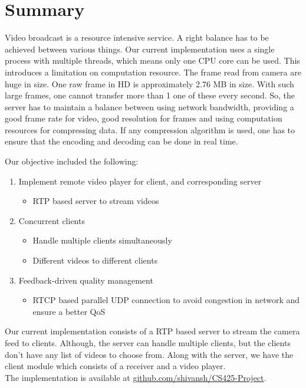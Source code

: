 \documentclass[a4paper]{article}
\begin{document}
  \section{Summary}
  	Video broadcast is a resource intensive service. A right balance has to be achieved between various things. Our current implementation uses a single process with multiple threads, which means only one CPU core can be used. This introduces a limitation on computation resource. The frame read from camera are huge in size. One raw frame in HD is approximately 2.76 MB in size. With such large frames, one cannot transfer more than 1 one of these every second. So, the server has to maintain a balance between using network bandwidth, providing a good frame rate for video, good resolution for frames and using computation resources for compressing data. If any compression algorithm is used, one has to ensure that the encoding and decoding can be done in real time. \par
    Our objective included the following: \par
    \begin{enumerate}
      \item Implement remote video player for client, and corresponding server
      	\begin{itemize}
      	  \item RTP based server to stream videos
      	\end{itemize}
      \item Concurrent clients
        \begin{itemize}
          \item Handle multiple clients simultaneously
          \item Different videos to different clients
        \end{itemize}
      \item Feedback-driven quality management
		\begin{itemize}
		\item RTCP based parallel UDP connection to avoid congestion in network and ensure a better QoS
		\end{itemize}
    \end{enumerate}
  	Our current implementation consists of a RTP based server to stream the camera feed to clients. Although, the server can handle multiple clients, but the clients don't have any list of videos to choose from. Along with the server, we have the client module which consists of a receiver and a video player. \\

    The implementation is available at \href{https://github.com/shivansh/CS425-Project}{github.com/shivansh/CS425-Project}.
\end{document}
